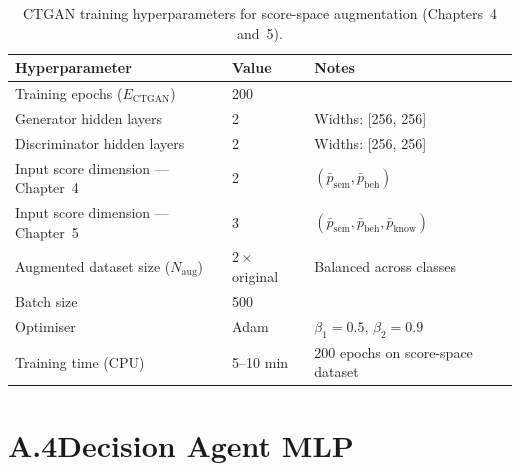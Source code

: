 \begin{table}[ht]
\centering
\caption{CTGAN training hyperparameters for score-space augmentation (Chapters~4 and~5).}
\label{tab:app_ctgan}
\begin{tabular}{@{}lll@{}}
\toprule
\textbf{Hyperparameter} & \textbf{Value} & \textbf{Notes} \\
\midrule
Training epochs ($E_{\mathrm{CTGAN}}$)      & 200   & \\
Generator hidden layers                     & 2     & Widths: [256, 256] \\
Discriminator hidden layers                 & 2     & Widths: [256, 256] \\
Input score dimension — Chapter~4           & 2     & $(\bar{p}_{\mathrm{sem}}, \bar{p}_{\mathrm{beh}})$ \\
Input score dimension — Chapter~5           & 3     & $(\bar{p}_{\mathrm{sem}}, \bar{p}_{\mathrm{beh}}, \bar{p}_{\mathrm{know}})$ \\
Augmented dataset size ($N_{\mathrm{aug}}$) & $2\times$ original & Balanced across classes \\
Batch size                                  & 500   & \\
Optimiser                                   & Adam  & $\beta_1=0.5$, $\beta_2=0.9$ \\
Training time (CPU)                         & 5--10 min & 200 epochs on score-space dataset \\
\bottomrule
\end{tabular}
\end{table}

\section*{A.4\quad Decision Agent MLP}

